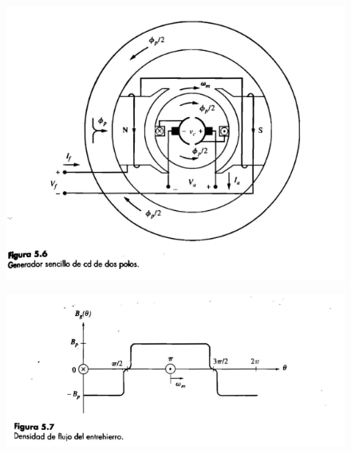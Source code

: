 \documentclass[]{article}
\begin{document}
\begin{figure}[h!]
	\centering
	\includegraphics[width=1\textwidth]{maquinaCD2polos}
	\caption{}
	\label{maq2polos}
\end{figure}

\begin{figure}[h!]
	\centering
	\includegraphics[width=1\textwidth]{densidadFlujoEntrehierro2polos}
	\caption{}
	\label{flujo2polos}
\end{figure}
\end{document}
